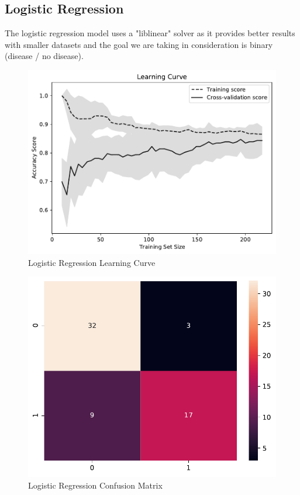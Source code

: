 \documentclass[conference]{IEEEtran}
\begin{document}
\subsection{Logistic Regression}
The logistic regression model uses a "liblinear" solver as it provides better results with smaller datasets and the goal we are taking in consideration is binary (disease / no disease).

\begin{figure}[H]
    \centerline{\includegraphics[width=0.9\linewidth]{images/LogisticRegression_lc.pdf}}
    \caption{Logistic Regression Learning Curve}
    \label{lr_lc}
\end{figure}

\noindent


\begin{figure}[H]
    \centerline{\includegraphics[width=0.8\linewidth]{images/log_reg_cm.pdf}}
    \caption{Logistic Regression Confusion Matrix}
    \label{lr_cm}
\end{figure}
\end{document}
